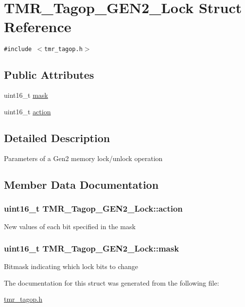 \hypertarget{struct_t_m_r___tagop___g_e_n2___lock}{
\section{TMR\_\-Tagop\_\-GEN2\_\-Lock Struct Reference}
\label{struct_t_m_r___tagop___g_e_n2___lock}
}
{\tt \#include $<$tmr\_\-tagop.h$>$}

\subsection*{Public Attributes}
\begin{CompactItemize}
\item 
uint16\_\-t \hyperlink{struct_t_m_r___tagop___g_e_n2___lock_e523efa9729a68cc8b302495ad362f96}{mask}
\item 
uint16\_\-t \hyperlink{struct_t_m_r___tagop___g_e_n2___lock_f8cead7f6d6bcee36133e019716ef02f}{action}
\end{CompactItemize}


\subsection{Detailed Description}
Parameters of a Gen2 memory lock/unlock operation 

\subsection{Member Data Documentation}
\hypertarget{struct_t_m_r___tagop___g_e_n2___lock_f8cead7f6d6bcee36133e019716ef02f}{
\subsubsection[{action}]{\setlength{\rightskip}{0pt plus 5cm}uint16\_\-t {\bf TMR\_\-Tagop\_\-GEN2\_\-Lock::action}}}
\label{struct_t_m_r___tagop___g_e_n2___lock_f8cead7f6d6bcee36133e019716ef02f}


New values of each bit specified in the mask \hypertarget{struct_t_m_r___tagop___g_e_n2___lock_e523efa9729a68cc8b302495ad362f96}{
\subsubsection[{mask}]{\setlength{\rightskip}{0pt plus 5cm}uint16\_\-t {\bf TMR\_\-Tagop\_\-GEN2\_\-Lock::mask}}}
\label{struct_t_m_r___tagop___g_e_n2___lock_e523efa9729a68cc8b302495ad362f96}


Bitmask indicating which lock bits to change 

The documentation for this struct was generated from the following file:\begin{CompactItemize}
\item 
\hyperlink{tmr__tagop_8h}{tmr\_\-tagop.h}\end{CompactItemize}
